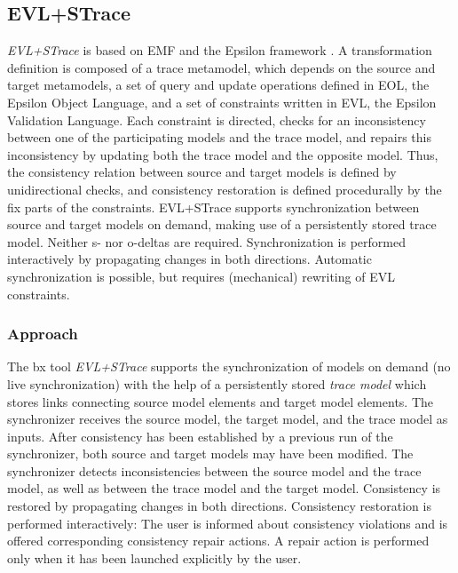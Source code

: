 \subsection{EVL+STrace}
\label{sec:EVLPlusSTrace}




\emph{EVL+STrace} \cite{IST2018-Samimi} is based on EMF and the Epsilon framework \cite{epsilon}. A transformation definition is composed of a trace metamodel, which depends on the source and target metamodels, a set of query and update operations defined in EOL, the Epsilon Object Language, and a set of constraints written in EVL, the Epsilon Validation Language. Each constraint is directed, checks for an inconsistency between one of the participating models and the trace model, and repairs this inconsistency by updating both the trace model and the opposite model. Thus, the consistency relation between source and target models is defined by unidirectional checks, and consistency restoration is defined procedurally by the fix parts of the constraints. EVL+STrace supports synchronization between source and target models on demand, making use of a persistently stored trace model. Neither s- nor o-deltas are required. Synchronization is performed interactively by propagating changes in both directions. Automatic synchronization is possible, but requires (mechanical) rewriting of EVL constraints. 


\subsubsection{Approach}
\label{sec:ApproachEVL}

The bx tool \emph{EVL+STrace} \cite{IST2018-Samimi} supports the synchronization of models on demand (no live synchronization) with the help of a persistently stored \emph{trace model} which stores links connecting source model elements and target model elements. The synchronizer receives the source model, the target model, and the trace model as inputs. After consistency has been established by a previous run of the synchronizer, both source and target models may have been modified. The synchronizer detects inconsistencies between the source model and the trace model, as well as between the trace model and the target model. Consistency is restored by propagating changes in both directions. Consistency restoration is performed interactively: The user is informed about consistency violations and is offered corresponding consistency repair actions. A repair action is performed only when it has been launched explicitly by the user.

